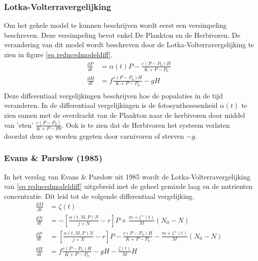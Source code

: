 \subsubsection{Lotka-Volterravergelijking}
Om het gehele model te kunnen beschrijven wordt eerst een versimpeling beschreven. Deze versimpeling bevat enkel De Plankton en de Herbivoren. De verandering van dit model wordt beschreven door de Lotka-Volterravergelijking te zien in figure \ref{eq reducedmodeldiff}.
\begin{equation}
    \begin{split}
        \frac{dP}{dt} &= \alpha(t) P-\frac{c(P-P_0)H}{K+P-P_0} \\[1ex] 
        \frac{dH}{dt} &= f\frac{c(P-P_0)H}{K+P-P_0}-gH\\[1ex] 
     \label{eq reducedmodeldiff}
    \end{split}
\end{equation}
Deze differentiaal vergelijkingen beschrijven hoe de populaties in de tijd veranderen. In de differentiaal vergelijkingen is de fotosynthesesenheid $\alpha(t)$ te zien samen met de overdracht van de Plankton naar de herbivoren door middel van 'eten' $\frac{c(P-P_0)}{K+P-P0}$. Ook is te zien dat de Herbivoren het systeem verlaten doordat deze op worden gegeten door carnivoren of sterven $-g$. 

\subsubsection{Evans \& Parslow (1985)}
In het verslag van Evans \& Parslow uit 1985 \cite{Algen1985} wordt de Lotka-Volterravergelijking van \ref{eq reducedmodeldiff} uitgebreid met de geheel gemixde laag en de nutrienten concentratie. Dit leid tot de volgende differentiaal vergelijking.
\begin{equation}
    \begin{split}
        \frac{dM}{dt} &= \zeta(t) \\[1ex] 
        \frac{dN}{dt} &= -\left[ \frac{\alpha(t,M,P)N}{j+N}-r \right] P+\frac{m+\zeta^+(t)}{M}(N_0-N) \\[1ex] 
        \frac{dP}{dt} &= \left[\frac{\alpha(t,M,P)N}{j+N}-r\right]P-\frac{c(P-P_0)H}{K+P-P_0}-\frac{m+\zeta^+(t)}{M}(N_0-N) \\[1ex] 
        \frac{dH}{dt} &= f\frac{c(P-P_0)H}{K+P-P_0}-gH-\frac{\zeta(t)}{M}H \\[1ex] 
    \end{split}
     \label{eq modeldiff}
\end{equation}

